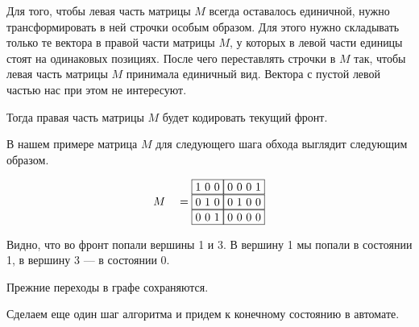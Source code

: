 \begin{example}
Для того, чтобы левая часть матрицы $M$ всегда оставалось единичной, нужно трансформировать в ней строчки особым образом.
Для этого нужно складывать только те вектора в правой части матрицы $M$, у которых в левой части единицы стоят на одинаковых позициях.
После чего переставлять строчки в $M$ так, чтобы левая часть матрицы $M$ принимала единичный вид.
Вектора с пустой левой частью нас при этом не интересуют.

Тогда правая часть матрицы $M$ будет кодировать текущий фронт.

В нашем примере матрица $M$ для следующего шага обхода выглядит следующим образом.

\begin{alignat*}{7}
  & &&M &&=\begin{matrix}
    \fbox{1 0 0} \fbox{0 0 0 1} \\ 
    \fbox{0 1 0} \fbox{0 1 0 0} \\
    \fbox{0 0 1} \fbox{0 0 0 0}
        \end{matrix}
\end{alignat*}

Видно, что во фронт попали вершины 1 и 3. В вершину 1 мы попали в состоянии 1, в вершину 3 --- в состоянии 0.

Прежние переходы в графе сохраняются.

\begin{center}
  \label{input_rpq}
\end{center}

Сделаем еще один шаг алгоритма и придем к конечному состоянию в автомате.


\end{example}

